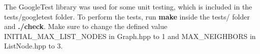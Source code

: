 \documentclass[11pt]{article}
\begin{document}
\vspace{5mm}

The GoogleTest library was used for some unit testing, which is included in the tests/googletest folder. To perform the tests, run \textbf{make} inside the tests/ folder and \textbf{./check}. 
Make sure to change the defined value INITIAL\_MAX\_LIST\_NODES in Graph.hpp to 1 and MAX\_NEIGHBORS in ListNode.hpp to 3.
\end{document}
